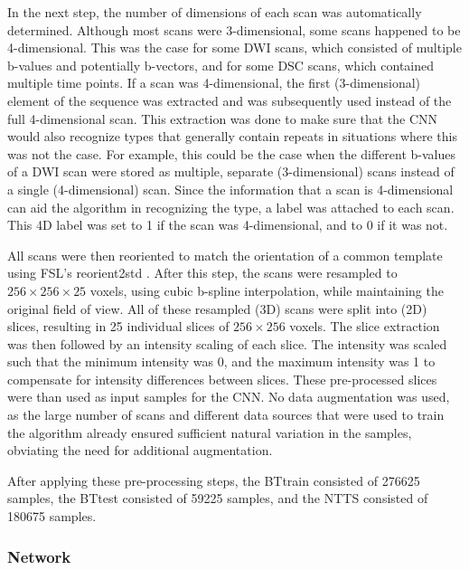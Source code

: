 In the next step, the number of dimensions of each \gls{scan} was automatically determined.
Although most \glspl{scan} were 3-dimensional, some \glspl{scan} happened to be 4-dimensional.
This was the case for some \gls{DWI} \glspl{scan}, which consisted of multiple b-values and potentially b-vectors, and for some \gls{DSC} \glspl{scan}, which contained multiple time points.
If a \gls{scan} was 4-dimensional, the first (3-dimensional) element of the sequence was extracted and was subsequently used instead of the full 4-dimensional \gls{scan}.
This extraction was done to make sure that the \gls{CNN} would also recognize \glspl{type} that generally contain repeats in situations where this was not the case.
For example, this could be the case when the different b-values of a \gls{DWI} \gls{scan} were stored as multiple, separate (3-dimensional) \glspl{scan} instead of a single (4-dimensional) \gls{scan}.
Since the information that a \gls{scan} is 4-dimensional can aid the algorithm in recognizing the \gls{type}, a  label was attached to each \gls{scan}.
This 4D label was set to 1 if the \gls{scan} was 4-dimensional, and to 0 if it was not.

All \glspl{scan} were then reoriented to match the orientation of a common template using FSL's reorient2std \autocite{jenkinson2012fsl}.
After this step, the \glspl{scan} were resampled to $ 256 \times 256 \times 25$ voxels, using cubic b-spline interpolation, while maintaining the original field of view.
All of these resampled (3D) \glspl{scan} were split into (2D) \glspl{slice}, resulting in \num{25} individual \glspl{slice} of $256 \times 256$ voxels.
The \gls{slice} extraction was then followed by an intensity scaling of each \gls{slice}.
The intensity was scaled such that the minimum intensity was 0, and the maximum intensity was \num{1} to compensate for intensity differences between \glspl{slice}.
These pre-processed \glspl{slice} were than used as input \glspl{sample} for the \gls{CNN}.
No data augmentation was used, as the large number of \glspl{scan} and different data sources that were used to train the algorithm already ensured sufficient natural variation in the \glspl{sample}, obviating the need for additional augmentation.

After applying these pre-processing steps, the \gls{BTtrain} consisted of \num{276625} \glspl{sample}, the \gls{BTtest} consisted of \num{59225} \glspl{sample}, and the \gls{NTTS} consisted of \num{180675} \glspl{sample}.

\subsubsection{Network}\label{sec:network}

